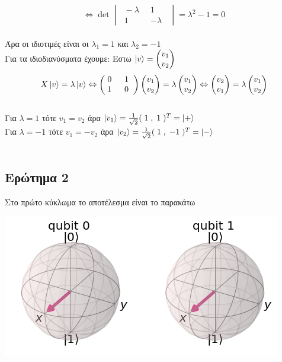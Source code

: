 \documentclass[12pt]{article}
\begin{document}
$$ \Leftrightarrow\det \begin{vmatrix}\;-\lambda \;\; & 1 \;\;\\ \;1 \;\; & -\lambda \;\;\end{vmatrix} = \lambda^2 -1=0 $$ \\
Άρα οι ιδιοτιμές είναι οι $\lambda_1 = 1$ και $\lambda_2=-1$ \\
Για τα ιδιοδιανύσματα έχουμε:
Εστω $\ket{v}=\begin{pmatrix} v_1 \\ v_2\end{pmatrix}$
$$X\ket{v}=\lambda\ket{ v} \Leftrightarrow \begin{pmatrix}\;0 \;\; & 1 \;\;\\ \;1 \;\; & 0 \;\;\end{pmatrix}\begin{pmatrix} v_1 \\ v_2\end{pmatrix}=\lambda\begin{pmatrix} v_1 \\ v_2\end{pmatrix} \Leftrightarrow 
\begin{pmatrix} v_2 \\ v_1\end{pmatrix} = \lambda \begin{pmatrix} v_1 \\ v_2\end{pmatrix}$$\\
Για $\lambda =1 $ τότε $v_1=v_2$ άρα $\ket{v_1} = \frac{1}{\sqrt{2}}(\;1\;,\;1\;)^T = \ket{+}$ \\
Για $\lambda =-1 $ τότε $v_1=-v_2$ άρα $\ket{v_2} = \frac{1}{\sqrt{2}}(\;1\;,\;-1\;)^T= \ket{-}$\\ \\
\subsection*{{\bf Ερώτημα 2}}
Στο πρώτο κύκλωμα το αποτέλεσμα είναι το παρακάτω
\begin{center}
    \includegraphics[]{notphasekickback.png}
\end{center}
\end{document}
